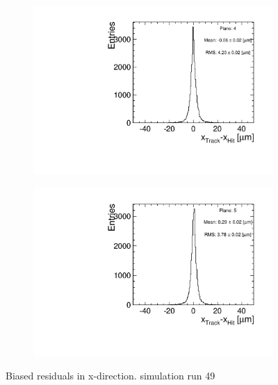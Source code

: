 \begin{figure}[htbp]
\begin{subfigure}[b]{0.3\textwidth}
    \includegraphics[width=\textwidth]{figures/Telescope/biasedResiduals/BiasedResiduals_run49_PlaneXRMS4.pdf}
    \caption{}
  \end{subfigure}\hfill
  \begin{subfigure}[b]{0.3\textwidth}
    \includegraphics[width=\textwidth]{figures/Telescope/biasedResiduals/BiasedResiduals_run49_PlaneXRMS5.pdf}
    \caption{}
  \end{subfigure}
  \caption{Biased residuals in x-direction. simulation run 49}
  \label{fig:telescope_biasedResiduals_simu_X}
\end{figure}

